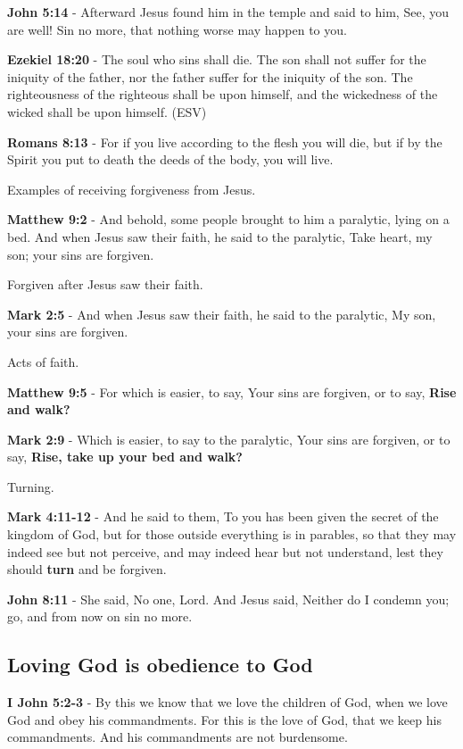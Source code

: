 \documentclass[11pt]{article}
\begin{document}
\textbf{John 5:14} - Afterward Jesus found him in the temple and said to him, See, you are well! Sin no more, that nothing worse may happen to you.

\textbf{Ezekiel 18:20} - The soul who sins shall die. The son shall not suffer for the iniquity of the father, nor the father suffer for the iniquity of the son. The righteousness of the righteous shall be upon himself, and the wickedness of the wicked shall be upon himself. (ESV)

\textbf{Romans 8:13} - For if you live according to the flesh you will die, but if by the Spirit you put to death the deeds of the body, you will live.

Examples of receiving forgiveness from Jesus.

\textbf{Matthew 9:2} - And behold, some people brought to him a paralytic, lying on a bed. And when Jesus saw their faith, he said to the paralytic, Take heart, my son; your sins are forgiven.

Forgiven after Jesus saw their faith.

\textbf{Mark 2:5} - And when Jesus saw their faith, he said to the paralytic, My son, your sins are forgiven.

Acts of faith.

\textbf{Matthew 9:5} - For which is easier, to say, Your sins are forgiven, or to say, \textbf{Rise and walk?}

\textbf{Mark 2:9} - Which is easier, to say to the paralytic, Your sins are forgiven, or to say, \textbf{Rise, take up your bed and walk?}

Turning.

\textbf{Mark 4:11-12} - And he said to them, To you has been given the secret of the kingdom of God, but for those outside everything is in parables, so that they may indeed see but not perceive, and may indeed hear but not understand, lest they should \textbf{turn} and be forgiven.

\textbf{John 8:11} - She said, No one, Lord. And Jesus said, Neither do I condemn you; go, and from now on sin no more.

\subsection{Loving God is obedience to God}
\label{sec:org3ec5091}
\textbf{I John 5:2-3} - By this we know that we love the children of God, when we love God and obey his commandments. For this is the love of God, that we keep his commandments. And his commandments are not burdensome.
\end{document}
